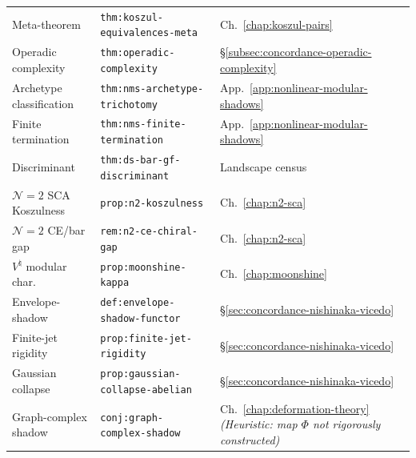 \begin{center}
\begin{tabular}{@{}p{3.6cm}lp{4.5cm}@{}}
Meta-theorem
 & \texttt{thm:koszul-equivalences-meta}
 & Ch.~\ref{chap:koszul-pairs} \\
Operadic complexity
 & \texttt{thm:operadic-complexity}
 & \S\ref{subsec:concordance-operadic-complexity} \\
Archetype classification
 & \texttt{thm:nms-archetype-trichotomy}
 & App.~\ref{app:nonlinear-modular-shadows} \\
Finite termination
 & \texttt{thm:nms-finite-termination}
 & App.~\ref{app:nonlinear-modular-shadows} \\
Discriminant
 & \texttt{thm:ds-bar-gf-discriminant}
 & Landscape census \\
$\mathcal{N}{=}2$ SCA Koszulness
 & \texttt{prop:n2-koszulness}
 & Ch.~\ref{chap:n2-sca} \\
$\mathcal{N}{=}2$ CE/bar gap
 & \texttt{rem:n2-ce-chiral-gap}
 & Ch.~\ref{chap:n2-sca} \\
$V^\natural$ modular char.
 & \texttt{prop:moonshine-kappa}
 & Ch.~\ref{chap:moonshine} \\
Envelope-shadow
 & \texttt{def:envelope-shadow-functor}
 & \S\ref{sec:concordance-nishinaka-vicedo} \\
Finite-jet rigidity
 & \texttt{prop:finite-jet-rigidity}
 & \S\ref{sec:concordance-nishinaka-vicedo} \\
Gaussian collapse
 & \texttt{prop:gaussian-collapse-abelian}
 & \S\ref{sec:concordance-nishinaka-vicedo} \\
Graph-complex shadow
 & \texttt{conj:graph-complex-shadow}
 & Ch.~\ref{chap:deformation-theory}
 \emph{(Heuristic: map $\Phi$ not rigorously constructed)} \\
\bottomrule
\end{tabular}
\end{center}

